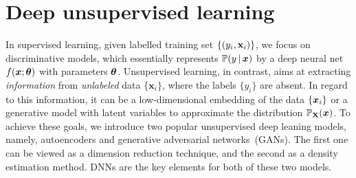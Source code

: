 \section{Deep unsupervised learning}\label{sec:unsup}


In supervised learning, given labelled training set $\{(y_i,\mathrm{\bf x}_i)\}$, we focus on discriminative models, which essentially represents $\mathbb{P}(y\,|\,\text{\boldmath $x$})$ by a deep neural net $f(\text{\boldmath $x$}; \text{\boldmath $\theta$})$ with parameters $\text{\boldmath $\theta$}$. Unsupervised learning, in contrast, aims at extracting \emph{information} from \emph{unlabeled} data $\{\bm{x}_{i}\}$, where the labels $\{y_i\}$ are absent. In regard to this information, it can be a low-dimensional embedding of the data $\{ \text{\boldmath $x$}_i \}$ or a generative model with latent variables to approximate the distribution $\mathbb{P}_{\mathrm{\bf X}}(\text{\boldmath $x$})$. To achieve these goals, we introduce two popular unsupervised deep leaning models, namely, autoencoders and generative
adversarial networks~(GANs). The first one can be viewed as a dimension reduction technique, and the second as a density estimation method. DNNs are the key elements for both of these two models. %



